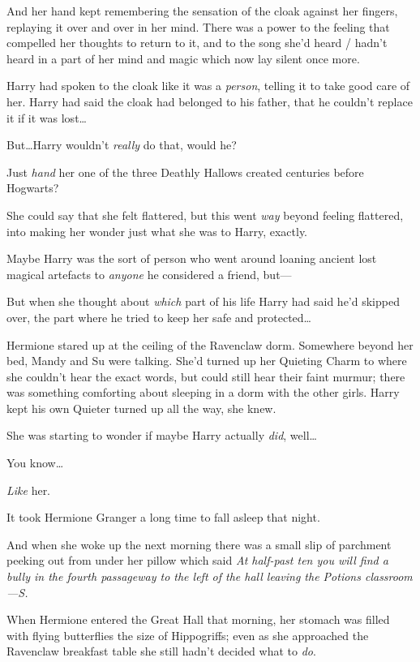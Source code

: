 And her hand kept remembering the sensation of the cloak against her fingers, replaying it over and over in her mind. There was a power to the feeling that compelled her thoughts to return to it, and to the song she’d heard / hadn’t heard in a part of her mind and magic which now lay silent once more.

Harry had spoken to the cloak like it was a \emph{person}, telling it to take good care of her. Harry had said the cloak had belonged to his father, that he couldn’t replace it if it was lost…

But…Harry wouldn’t \emph{really} do that, would he?

Just \emph{hand} her one of the three Deathly Hallows created centuries before Hogwarts?

She could say that she felt flattered, but this went \emph{way} beyond feeling flattered, into making her wonder just what she was to Harry, exactly.

Maybe Harry was the sort of person who went around loaning ancient lost magical artefacts to \emph{anyone} he considered a friend, but—

But when she thought about \emph{which} part of his life Harry had said he’d skipped over, the part where he tried to keep her safe and protected…

Hermione stared up at the ceiling of the Ravenclaw dorm. Somewhere beyond her bed, Mandy and Su were talking. She’d turned up her Quieting Charm to where she couldn’t hear the exact words, but could still hear their faint murmur; there was something comforting about sleeping in a dorm with the other girls. Harry kept his own Quieter turned up all the way, she knew.

She was starting to wonder if maybe Harry actually \emph{did}, well…

You know…

\emph{Like} her.

It took Hermione Granger a long time to fall asleep that night.

And when she woke up the next morning there was a small slip of parchment peeking out from under her pillow which said \emph{At half-past ten you will find a bully in the fourth passageway to the left of the hall leaving the Potions classroom—S.}

\later

When Hermione entered the Great Hall that morning, her stomach was filled with flying butterflies the size of Hippogriffs; even as she approached the Ravenclaw breakfast table she still hadn’t decided what to \emph{do}.

